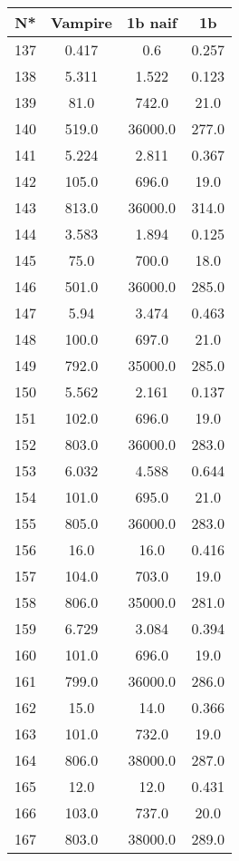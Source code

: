 \begin{table}[H]
\begin{tabular}{|c|c|c|c|}
\hline
N* & Vampire & 1b naif & 1b \\
\hline
137 & 0.417 & 0.6 & 0.257 \\
\hline
138 & 5.311 & 1.522 & 0.123 \\
\hline
139 & 81.0 & 742.0 & 21.0 \\
\hline
140 & 519.0 & 36000.0 & 277.0 \\
\hline
141 & 5.224 & 2.811 & 0.367 \\
\hline
142 & 105.0 & 696.0 & 19.0 \\
\hline
143 & 813.0 & 36000.0 & 314.0 \\
\hline
144 & 3.583 & 1.894 & 0.125 \\
\hline
145 & 75.0 & 700.0 & 18.0 \\
\hline
146 & 501.0 & 36000.0 & 285.0 \\
\hline
147 & 5.94 & 3.474 & 0.463 \\
\hline
148 & 100.0 & 697.0 & 21.0 \\
\hline
149 & 792.0 & 35000.0 & 285.0 \\
\hline
150 & 5.562 & 2.161 & 0.137 \\
\hline
151 & 102.0 & 696.0 & 19.0 \\
\hline
152 & 803.0 & 36000.0 & 283.0 \\
\hline
153 & 6.032 & 4.588 & 0.644 \\
\hline
154 & 101.0 & 695.0 & 21.0 \\
\hline
155 & 805.0 & 36000.0 & 283.0 \\
\hline
156 & 16.0 & 16.0 & 0.416 \\
\hline
157 & 104.0 & 703.0 & 19.0 \\
\hline
158 & 806.0 & 35000.0 & 281.0 \\
\hline
159 & 6.729 & 3.084 & 0.394 \\
\hline
160 & 101.0 & 696.0 & 19.0 \\
\hline
161 & 799.0 & 36000.0 & 286.0 \\
\hline
162 & 15.0 & 14.0 & 0.366 \\
\hline
163 & 101.0 & 732.0 & 19.0 \\
\hline
164 & 806.0 & 38000.0 & 287.0 \\
\hline
165 & 12.0 & 12.0 & 0.431 \\
\hline
166 & 103.0 & 737.0 & 20.0 \\
\hline
167 & 803.0 & 38000.0 & 289.0 \\

\end{tabular}
\end{table}
